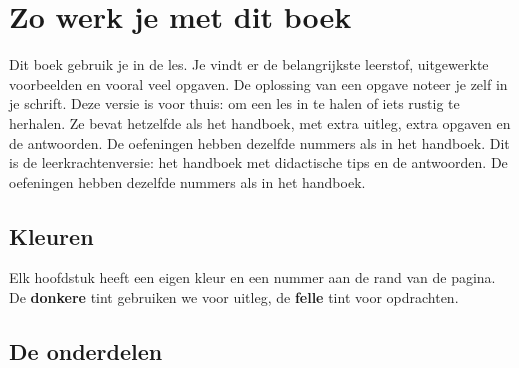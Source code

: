 \chapter*{Zo werk je met dit boek}

\ifhandboek
Dit boek gebruik je in de les. Je vindt er de belangrijkste leerstof, uitgewerkte voorbeelden en vooral veel opgaven. De oplossing van een opgave noteer je zelf in je schrift.
\fi
\ifzelfstudie
Deze versie is voor thuis: om een les in te halen of iets rustig te herhalen. Ze bevat hetzelfde als het handboek, met extra uitleg, extra opgaven en de antwoorden. De oefeningen hebben dezelfde nummers als in het handboek.
\fi
\ifleerkracht
Dit is de leerkrachtenversie: het handboek met didactische tips en de antwoorden. De oefeningen hebben dezelfde nummers als in het handboek.
\fi

\section*{Kleuren}

Elk hoofdstuk heeft een eigen kleur en een nummer aan de rand van de pagina. De \textbf{donkere} tint gebruiken we voor uitleg, de \textbf{felle} tint voor opdrachten.

\section*{De onderdelen}

